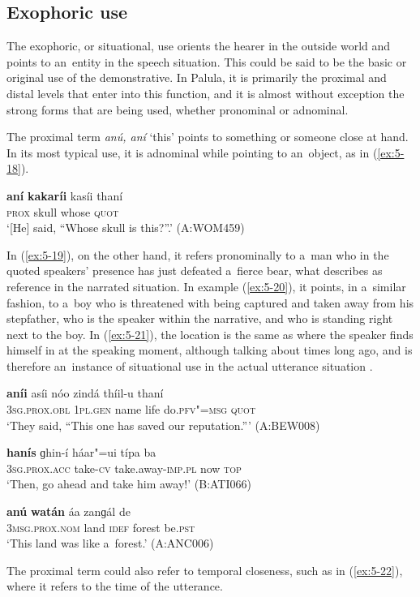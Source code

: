 \subsection{Exophoric use}
\label{subsec:5-2-3}

The exophoric, or situational, use orients the hearer in the outside world and points to an~entity in the speech situation. This could be said to be the basic or original use of the demonstrative. In Palula, it is primarily the proximal and distal levels that enter into this function, and it is almost without exception the strong forms that are being used, whether pronominal or adnominal.


The proximal term \textit{anú, aní} `this' points to something or someone close at hand. In its most typical use, it is adnominal while pointing to an~object, as in (\ref{ex:5-18}).

\begin{exe}
\ex
\label{ex:5-18}
\gll \textbf{aní} \textbf{kakaríi} kasíi thaní \\
\textsc{prox} skull whose \textsc{quot} \\
\glt `[He] said, ``Whose skull is this?''.' (A:WOM459)
\end{exe}
In (\ref{ex:5-19}), on the other hand, it refers pronominally to a~man who in the quoted speakers' presence has just defeated a~fierce bear, what \citet[222]{himmelmann1996} describes as reference in the narrated situation. In example (\ref{ex:5-20}), it points, in a~similar fashion, to a~boy who is threatened with being captured and taken away from his stepfather, who is the speaker within the narrative, and who is standing right next to the boy. In (\ref{ex:5-21}), the location is the same as where the speaker finds himself in at the speaking moment, although talking about times long ago, and is therefore an~instance of situational use in the actual utterance situation \citep[222]{himmelmann1996}.

\begin{exe}
\ex
\label{ex:5-19}
\gll \textbf{aníi} asíi nóo zindá thíil-u thaní \\
\textsc{3sg.prox.obl} \textsc{1pl.gen} name life do.\textsc{pfv"=msg} \textsc{quot} \\
\glt `They said, ``This one has saved our reputation.''' (A:BEW008)

\ex
\label{ex:5-20}
\gll \textbf{hanís} ɡhin-í háar"=ui típa ba \\
\textsc{3sg.prox.acc} take-\textsc{cv} take.away-\textsc{imp.pl} now \textsc{top} \\
\glt `Then, go ahead and take him away!' (B:ATI066)

\ex
\label{ex:5-21}
\gll \textbf{anú} \textbf{watán} áa zanɡál de \\
\textsc{3msg.prox.nom} land \textsc{idef} forest be.\textsc{pst} \\
\glt `This land was like a~forest.' (A:ANC006)
\end{exe}
The proximal term could also refer to temporal closeness, such as in (\ref{ex:5-22}), where it refers to the time of the utterance.


